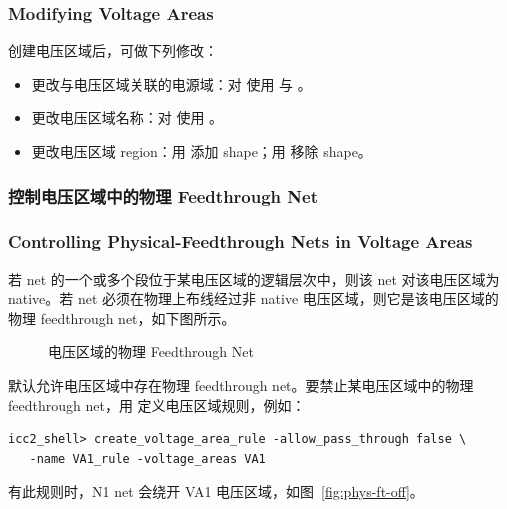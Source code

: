 \subsubsection*{Modifying Voltage Areas}

创建电压区域后，可做下列修改：
\begin{itemize}
  \item 更改与电压区域关联的电源域：对  使用  与 。
  \item 更改电压区域名称：对  使用 。
  \item 更改电压区域 region：用  添加 shape；用  移除 shape。
\end{itemize}

\subsubsection{控制电压区域中的物理 Feedthrough Net}
\subsubsection*{Controlling Physical-Feedthrough Nets in Voltage Areas}

若 net 的一个或多个段位于某电压区域的逻辑层次中，则该 net 对该电压区域为 native。若 net 必须在物理上布线经过非 native 电压区域，则它是该电压区域的物理 feedthrough net，如下图所示。

\begin{figure}[htbp]
\centering
{}
\caption{电压区域的物理 Feedthrough Net}
\label{fig:phys-ft}
\end{figure}

默认允许电压区域中存在物理 feedthrough net。要禁止某电压区域中的物理 feedthrough net，用  定义电压区域规则，例如：
\begin{lstlisting}
icc2_shell> create_voltage_area_rule -allow_pass_through false \
   -name VA1_rule -voltage_areas VA1
\end{lstlisting}

有此规则时，N1 net 会绕开 VA1 电压区域，如图~\ref{fig:phys-ft-off}。

